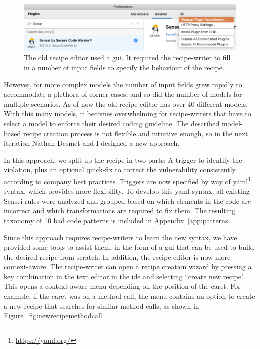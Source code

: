 \begin{figure}
  \centering
  \includegraphics[width=\textwidth,page=7]{04-tools/figures/figures2.pdf}
  \caption[Old model-based recipe editor]{The old recipe editor used a \gls{gui}. It required the recipe-writer to fill in a number of input fields to specify the behaviour of the recipe.}
  \label{fig:recipeedit2} 
\end{figure}

However, for more complex models the number of input fields grew rapidly to accommodate a plethora of corner cases, and so did the number of models for multiple scenarios.
As of now the old recipe editor has over 40 different models.
With this many models, it becomes overwhelming for recipe-writers that have to select a model to enforce their desired coding guideline.
The described model-based recipe creation process is not flexible and intuitive enough, so in the next iteration Nathan Desmet and I designed a new approach.

In this approach, we split up the recipe in two parts: A trigger to identify the violation, plus an optional quick-fix to correct the vulnerability consistently according to company best practices.
Triggers are now specified by way of \gls{yaml}\footnote{\url{https://yaml.org/}} syntax, which provides more flexibility.
To develop this \gls{yaml} syntax, all existing Sensei rules were analyzed and grouped based on which elements in the code are incorrect and which transformations are required to fix them.
The resulting taxonomy of 10 bad code patterns is included in Appendix~\ref{app:patterns}.

Since this approach requires recipe-writers to learn the new syntax, we have provided some tools to assist them, in the form of a \gls{gui} that can be used to build the desired recipe from scratch.
In addition, the recipe editor is now more context-aware.
The recipe-writer can open a recipe creation wizard by pressing a key combination in the text editor in the \gls{ide} and selecting ``create new recipe".
This opens a context-aware menu depending on the position of the caret.
For example, if the caret was on a method call, the menu contains an option to create a new recipe that searches for similar method calls, as shown in Figure~\ref{fig:newrecipemethodcall}.

